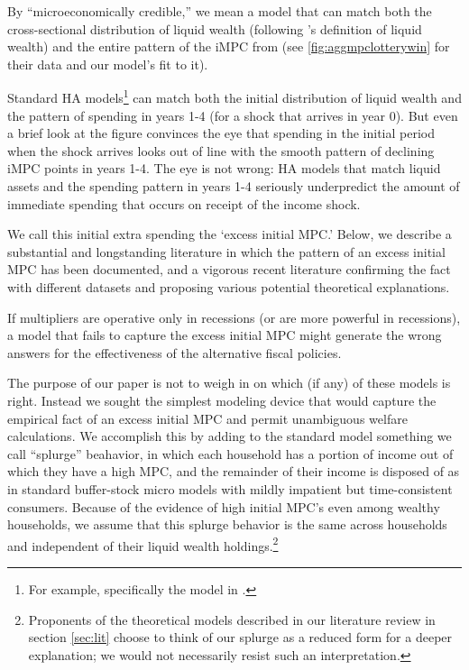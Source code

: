 \documentclass[\econtexRoot/HAFiscal]{subfiles}
\begin{document}
\hypertarget{microeconomically-credible}{}
By ``microeconomically credible,'' we mean a model that can match both the cross-sectional distribution of liquid wealth (following \cite{kaplan2014model}'s definition of liquid wealth) and the entire pattern of the iMPC from \cite{fagereng_mpc_2021} (see \ref{fig:aggmpclotterywin} for their data and our model's fit to it).

\hypertarget{excess-initial-mpc}{}
Standard HA models\footnote{For example, specifically the model in \cite{cstwMPC}.} can match both the initial distribution of liquid wealth and the pattern of spending in years 1-4 (for a shock that arrives in year 0).  But even a brief look at the figure convinces the eye that spending in the initial period when the shock arrives looks out of line with the smooth pattern of declining iMPC points in years 1-4.  The eye is not wrong: HA models that match liquid assets and the spending pattern in years 1-4 seriously underpredict the amount of immediate spending that occurs on receipt of the income shock.

We call this initial extra spending the `excess initial MPC.'  Below, we describe a substantial and longstanding literature in which the pattern of an excess initial MPC has been documented, and a vigorous recent literature confirming the fact with different datasets and proposing various potential theoretical explanations.

If multipliers are operative only in recessions (or are more powerful in recessions), a model that fails to capture the excess initial MPC might generate the wrong answers for the effectiveness of the alternative fiscal policies.

The purpose of our paper is not to weigh in on which (if any) of these models is right.  Instead we sought the simplest modeling device that would capture the empirical fact of an excess initial MPC and permit unambiguous welfare calculations.  We accomplish this by adding to the standard model something we call ``splurge'' beahavior, in which each household has a portion of income out of which they have a high MPC, and the remainder of their income is disposed of as in standard buffer-stock micro models with mildly impatient but time-consistent consumers.  Because of the evidence of high initial MPC's even among wealthy households, we assume that this splurge behavior is the same across households and independent of their liquid wealth holdings.\footnote{Proponents of the theoretical models described in our literature review in section \ref{sec:lit} choose to think of our splurge as a reduced form for a deeper explanation; we would not necessarily resist such an interpretation.}
\end{document}
